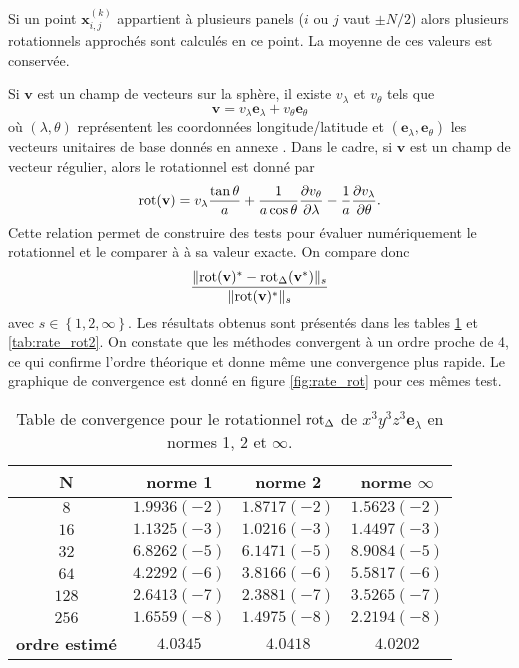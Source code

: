 Si un point $\mathbf{x}_{i,j}^{(k)}$ appartient à plusieurs panels ($i$ ou $j$ vaut $\pm N/2$) alors plusieurs rotationnels approchés sont calculés en ce point. La moyenne de ces valeurs est conservée.

Si $\mathbf{v}$ est un champ de vecteurs sur la sphère, il existe $v_{\lambda}$ et $v_{\theta}$ tels que 
\begin{equation}
\mathbf{v} = v_{\lambda} \mathbf{e}_{\lambda} + v_{\theta} \mathbf{e}_{\theta}
\end{equation} 
où $(\lambda,\theta)$ représentent les coordonnées longitude/latitude et $(\mathbf{e}_{\lambda}, \mathbf{e}_{\theta})$ les vecteurs unitaires de base donnés en annexe \REF.
Dans le cadre, si $\mathbf{v}$ est un champ de vecteur régulier, alors le rotationnel est donné par 
\begin{equation}
\text{rot}(\mathbf{v}) = v_{\lambda} \dfrac{\tan \theta}{a} + \dfrac{1}{a \cos \theta} \dfrac{\partial v_{\theta}}{\partial \lambda} - \dfrac{1}{a} \dfrac{\partial v_{\lambda}}{\partial \theta}.
\end{equation}
Cette relation permet de construire des tests pour évaluer numériquement le rotationnel et le comparer à à sa valeur exacte. On compare donc
\begin{equation}
\dfrac{\| \text{rot}(\mathbf{v})^* - \text{rot}_{\Delta} (\mathbf{v}^*) \|_s}{\| \text{rot}(\mathbf{v})^* \|_s}
\end{equation}
avec $s \in \left\lbrace 1, 2, \infty \right\rbrace$. Les résultats obtenus sont présentés dans les tables \ref{tab:rate_rot} et \ref{tab:rate_rot2}. On constate que les méthodes convergent à un ordre proche de 4, ce qui confirme l'ordre théorique et donne même une convergence plus rapide. Le graphique de convergence est donné en figure \ref{fig:rate_rot} pour ces mêmes test.

\begin{table}[htbp]
\begin{center}
\begin{tabular}{|c||c|c|c|}
\hline
\textbf{N}  & \textbf{norme 1} & \textbf{norme 2} & \textbf{norme $\infty$} \\
\hline
\hline
$8$  & $1.9936(-2)$ & $1.8717(-2)$ & $1.5623(-2)$  \\
$16$ & $1.1325(-3)$ & $1.0216(-3)$ & $1.4497(-3)$  \\
$32$ & $6.8262(-5)$ & $6.1471(-5)$ & $8.9084(-5)$  \\
$64$ & $4.2292(-6)$ & $3.8166(-6)$ & $5.5817(-6)$  \\
$128$& $2.6413(-7)$ & $2.3881(-7)$ & $3.5265(-7)$  \\
$256$& $1.6559(-8)$ & $1.4975(-8)$ & $2.2194(-8)$  \\
\hline 
\hline
\textbf{ordre estimé}& $4.0345$ & $4.0418$ & $4.0202$\\
\hline
\end{tabular}
\end{center}
\caption{Table de convergence pour le rotationnel $\text{rot}_{\Delta}$ de $ x^3 y^3 z^3 \mathbf{e}_{\lambda}$ en normes 1, 2 et $\infty$.}
\label{tab:rate_rot}
\end{table} 

